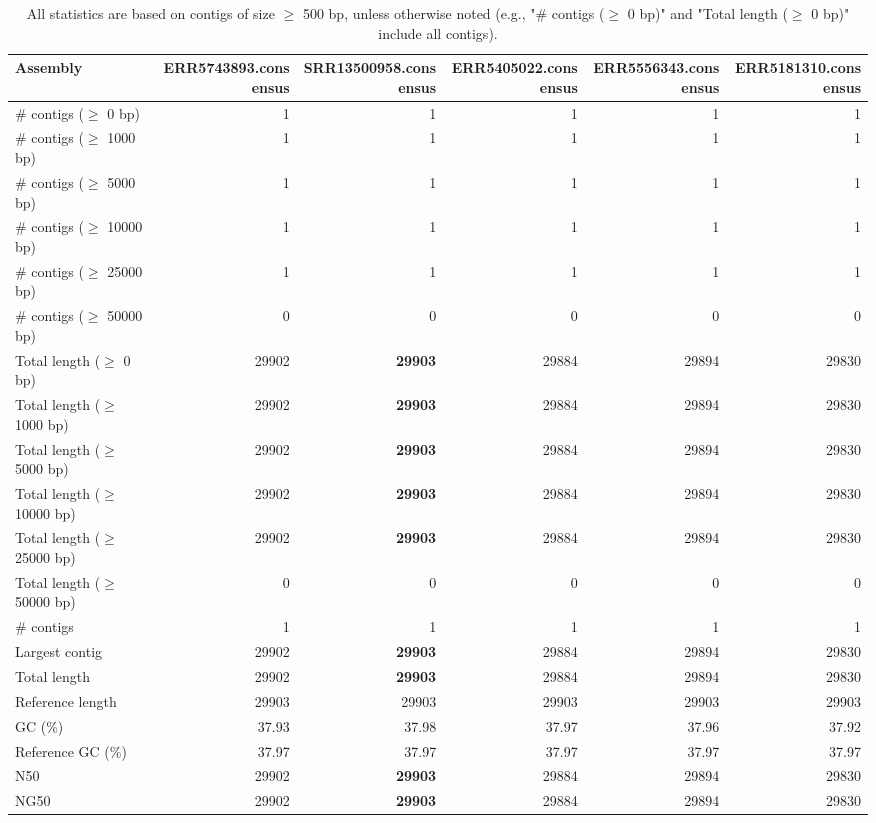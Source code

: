 \documentclass[12pt,a4paper]{article}
\begin{document}
\begin{table}[ht]
\begin{center}
\caption{All statistics are based on contigs of size $\geq$ 500 bp, unless otherwise noted (e.g., "\# contigs ($\geq$ 0 bp)" and "Total length ($\geq$ 0 bp)" include all contigs).}
\begin{tabular}{|l*{5}{|r}|}
\hline
Assembly & ERR5743893.consensus & SRR13500958.consensus & ERR5405022.consensus & ERR5556343.consensus & ERR5181310.consensus \\ \hline
\# contigs ($\geq$ 0 bp) & 1 & 1 & 1 & 1 & 1 \\ \hline
\# contigs ($\geq$ 1000 bp) & 1 & 1 & 1 & 1 & 1 \\ \hline
\# contigs ($\geq$ 5000 bp) & 1 & 1 & 1 & 1 & 1 \\ \hline
\# contigs ($\geq$ 10000 bp) & 1 & 1 & 1 & 1 & 1 \\ \hline
\# contigs ($\geq$ 25000 bp) & 1 & 1 & 1 & 1 & 1 \\ \hline
\# contigs ($\geq$ 50000 bp) & 0 & 0 & 0 & 0 & 0 \\ \hline
Total length ($\geq$ 0 bp) & 29902 & {\bf 29903} & 29884 & 29894 & 29830 \\ \hline
Total length ($\geq$ 1000 bp) & 29902 & {\bf 29903} & 29884 & 29894 & 29830 \\ \hline
Total length ($\geq$ 5000 bp) & 29902 & {\bf 29903} & 29884 & 29894 & 29830 \\ \hline
Total length ($\geq$ 10000 bp) & 29902 & {\bf 29903} & 29884 & 29894 & 29830 \\ \hline
Total length ($\geq$ 25000 bp) & 29902 & {\bf 29903} & 29884 & 29894 & 29830 \\ \hline
Total length ($\geq$ 50000 bp) & 0 & 0 & 0 & 0 & 0 \\ \hline
\# contigs & 1 & 1 & 1 & 1 & 1 \\ \hline
Largest contig & 29902 & {\bf 29903} & 29884 & 29894 & 29830 \\ \hline
Total length & 29902 & {\bf 29903} & 29884 & 29894 & 29830 \\ \hline
Reference length & 29903 & 29903 & 29903 & 29903 & 29903 \\ \hline
GC (\%) & 37.93 & 37.98 & 37.97 & 37.96 & 37.92 \\ \hline
Reference GC (\%) & 37.97 & 37.97 & 37.97 & 37.97 & 37.97 \\ \hline
N50 & 29902 & {\bf 29903} & 29884 & 29894 & 29830 \\ \hline
NG50 & 29902 & {\bf 29903} & 29884 & 29894 & 29830 \\ \hline

\end{tabular}
\end{center}
\end{table}
\end{document}
